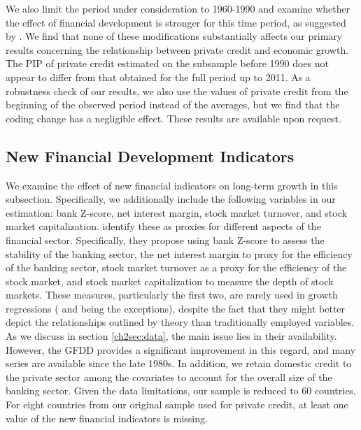 We also limit the period under consideration to 1960-1990 and examine whether the effect of financial development is stronger for this time period, as suggested by \citet{RousseauWachtel2011}. We find that none of these modifications substantially affects our primary results concerning the relationship between private credit and economic growth.  The PIP of private credit estimated on the subsample before 1990 does not appear to differ from that obtained for the full period up to 2011. As a robustness check of our results, we also use the values of private credit from the beginning of the observed period instead of the averages, but we find that the coding change has a negligible effect. These results are available upon request.

\subsection{New Financial Development Indicators}
We examine the effect of new financial indicators on long-term growth in this subsection. Specifically, we additionally include the following variables in our estimation: bank Z-score, net interest margin, stock market turnover, and stock market capitalization. \citet{Cihaketal2013} identify these as proxies for different aspects of the financial sector. Specifically, they propose using bank Z-score to assess the stability of the banking sector, the net interest margin to proxy for the efficiency of the banking sector, stock market turnover as a proxy for the efficiency of the stock market, and stock market capitalization to measure the depth of stock markets. These measures, particularly the first two, are rarely used in growth regressions (\citet{Bergeretal2004} and \citet{Hasanetal2009} being the exceptions), despite the fact that they might better depict the relationships outlined by theory than traditionally employed variables. As we discuss in section \ref{ch2sec:data}, the main issue lies in their availability. However, the \ac{GFDD} provides a significant improvement in this regard, and many series are available since the late 1980s. In addition, we retain domestic credit to the private sector among the covariates to account for the overall size of the banking sector. Given the data limitations, our sample is reduced to 60 countries. For eight countries from our original sample used for private credit, at least one value of the new financial indicators is missing.

